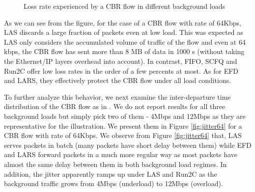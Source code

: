 \documentclass[preprint,12pt]{elsarticle}
\begin{document}
\begin{figure}[ht!]
   \centering
  	\caption{Loss rate experienced by a CBR flow in different background loads}
  	\label{fig:loss_rate}  
\end{figure}

As we can see from the figure, for the case of a CBR flow with rate of 64Kbps, LAS discards a large fraction of packets even at low load. This was expected as LAS only considers the accumulated volume of traffic of the flow and even at 64 kbps, the CBR flow has sent more than 8 MB of data in 1000 s (without taking the Ethernet/IP layers overhead into account). In contrast, FIFO, SCFQ and Run2C offer low loss rates in the order of a few percents at most. As for EFD and LARS, they effectively protect the CBR flow under all load conditions.

To further analyze this behavior, we next examine the inter-departure time distribution of the CBR flow as in \cite{Martin10Lars}. We do not report results for all three background loads but simply pick two of them  - 4Mbps and 12Mbps as they are representative for the illustration. We present them in Figure \ref{fig:jitter64} for a CBR flow with rate of 64Kbps.  We observe from Figure \ref{fig:jitter64} that, LAS serves packets in batch (many packets have short delay between them) while EFD and LARS forward packets in a much more regular way as most packets have almost the same delay between them in both background load regimes. In addition, the jitter apparently ramps up under LAS and Run2C as the background traffic grows from 4Mbps (underload) to 12Mbps (overload). 
\end{document}
